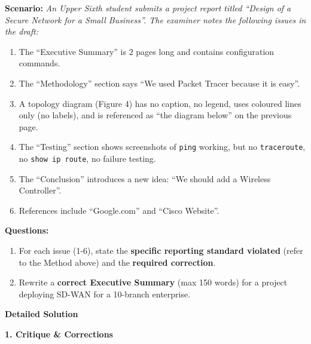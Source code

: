 \documentclass[11pt]{article}
\begin{document}
\begin{exoresolu}
\textbf{Scenario:} \textit{An Upper Sixth student submits a project report titled ``Design of a Secure Network for a Small Business''. The examiner notes the following issues in the draft:}
\begin{enumerate}
    \item The ``Executive Summary'' is $2$ pages long and contains configuration commands.
    \item The ``Methodology'' section says ``We used Packet Tracer because it is easy''.
    \item A topology diagram (Figure 4) has no caption, no legend, uses coloured lines only (no labels), and is referenced as ``the diagram below'' on the previous page.
    \item The ``Testing'' section shows screenshots of \texttt{ping} working, but no \texttt{traceroute}, no \texttt{show ip route}, no failure testing.
    \item The ``Conclusion'' introduces a new idea: ``We should add a Wireless Controller''.
    \item References include ``Google.com'' and ``Cisco Website''.
\end{enumerate}

\textbf{Questions:}
\begin{enumerate}
    \item For each issue (1-6), state the \textbf{specific reporting standard violated} (refer to the Method above) and the \textbf{required correction}.
    \item Rewrite a \textbf{correct Executive Summary} (max 150 words) for a project deploying SD-WAN for a 10-branch enterprise.
\end{enumerate}
\tcblower
\textbf{Detailed Solution}

\noindent\textbf{1. Critique \& Corrections}


\end{exoresolu}
\end{document}
